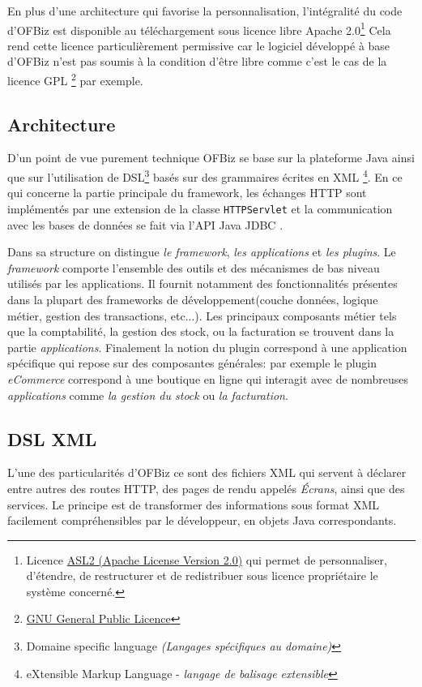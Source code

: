 En plus d'une architecture qui favorise la personnalisation, l'intégralité du code d'OFBiz est disponible au téléchargement sous licence libre Apache 2.0\footnote{Licence \href{https://www.apache.org/licenses/LICENSE-2.0.html}{ASL2 (Apache License Version 2.0)} qui permet de personnaliser, d'étendre, de restructurer et de redistribuer sous licence propriétaire le système concerné. } Cela rend cette licence particulièrement permissive car le logiciel développé à base d'OFBiz n'est pas soumis à la condition d'être libre comme c'est le cas de la licence GPL  \footnote{\href{http://www.gnu.org/licenses/gpl-3.0.html}{GNU General Public Licence}} par exemple.

\subsection{Architecture}
\label{architecture}
D'un point de vue purement technique OFBiz se base sur la plateforme Java ainsi que sur l'utilisation de DSL\footnote{Domaine specific language \emph{(Langages spécifiques au domaine)}} basés sur des grammaires écrites en XML \footnote{ eXtensible Markup Language - \emph{langage de balisage extensible}}. En ce qui concerne la partie principale du framework, les échanges HTTP sont implémentés par une extension de la classe \verb=HTTPServlet= \cite{chan2017servlet} et la communication avec les bases de données se fait via l'API Java JDBC \cite{JDBC}.

Dans sa structure on distingue \emph{le framework}, \emph{les applications} et \emph{les plugins}. Le \emph{framework} comporte l'ensemble des outils et des mécanismes de bas niveau utilisés par les applications. Il fournit notamment des fonctionnalités présentes dans la plupart des frameworks de développement(couche données, logique métier, gestion des transactions, etc...).
Les principaux composants métier tels que la comptabilité, la gestion des stock, ou la facturation se trouvent dans la partie \emph{applications}. 
Finalement la notion du plugin correspond à une application spécifique qui repose sur des composantes générales: par exemple le plugin \emph{eCommerce} correspond à une boutique en ligne qui interagit avec de nombreuses \emph{applications} comme \emph{la gestion du stock} ou \emph{la facturation}. 

\subsection{DSL XML}
\label{dsl}
L'une des particularités d'OFBiz ce sont des fichiers XML qui servent à déclarer entre autres
des routes HTTP, des pages de rendu appelés \emph{Écrans}, ainsi que des services. Le principe est de transformer des informations sous format XML facilement compréhensibles par le développeur, en objets Java correspondants. 


